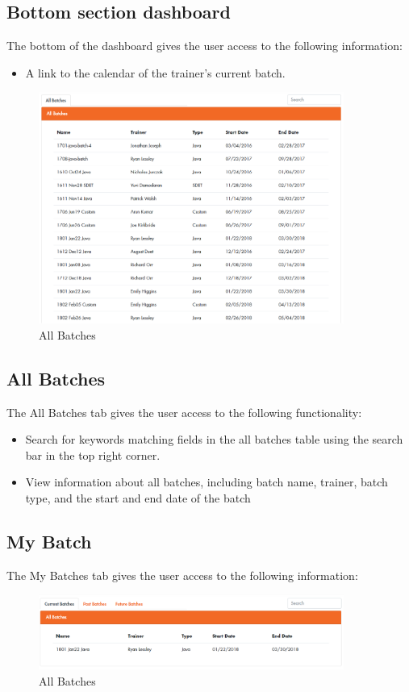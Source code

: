 \subsection{Bottom section dashboard}
The bottom of the dashboard gives the user access to the following information:
\begin{itemize}
    \item A link to the calendar of the trainer’s current batch.
\end{itemize}

\begin{figure}[htp]
\centering
\includegraphics[width=10cm]{images/Batchview}
\caption{All Batches}
\label{fig:lion}
\end{figure}

\subsection{All Batches}
The All Batches tab gives the user access to the following functionality:

\begin{itemize}
    \item Search for keywords matching fields in the all batches table using the search bar in the top right corner.
    \item View information about all batches, including batch name, trainer, batch type, and the start and end date of the batch
\end{itemize}

\subsection{My Batch}
The My Batches tab gives the user access to the following information:

\begin{figure}[htp]
\centering
\includegraphics[width=10cm]{images/myBatch}
\caption{All Batches}
\label{fig:lion}
\end{figure}

